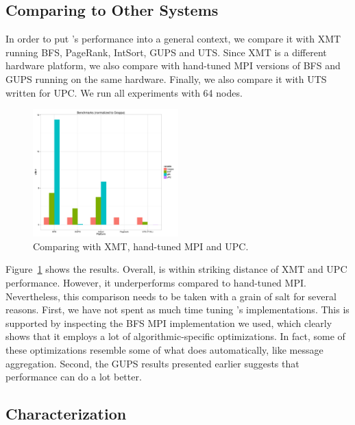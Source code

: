 \subsection{Comparing \Grappa to Other Systems}

In order to put \Grappa's performance into a general context, we compare it
with XMT running BFS, PageRank, IntSort, GUPS and UTS. Since XMT is a
different hardware platform, we also compare \Grappa with hand-tuned MPI
versions of BFS and GUPS running on the same hardware. Finally, we also
compare it with UTS written for UPC. We run all experiments with 64 nodes.

\begin{figure}[ht]
    \begin{center}
      \includegraphics[width=0.5\textwidth]{results/benchmarks.pdf}
    \end{center}
    \caption{Comparing \Grappa with XMT, hand-tuned MPI and UPC.}
    \label{fig:grappa-comparisons}
\end{figure}

Figure~\ref{fig:grappa-comparisons} shows the results. Overall, \Grappa is
within striking distance of XMT and UPC performance. However, it underperforms
compared to hand-tuned MPI. Nevertheless, this comparison needs to be taken
with a grain of salt for several reasons. First, we have not spent as much
time tuning \Grappa's implementations. This is supported by inspecting the BFS
MPI implementation we used, which clearly shows that it employs a lot of
algorithmic-specific optimizations. In fact, some of these optimizations
resemble some of what \Grappa does automatically, like message aggregation.
Second, the GUPS results presented earlier suggests that \Grappa performance
can do a lot better. 

\subsection{Characterization}


